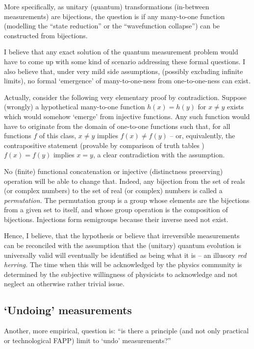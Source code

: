 \documentclass[%
 preprint,
 showpacs,
 showkeys,
 preprintnumbers,
 amsmath,amssymb,
 aps,
  pra,
  longbibliography,
 ]{revtex4-1}
\begin{document}
More specifically, as unitary (quantum) transformations (in-between measurements) are bijections,
the question is if any many-to-one function (modelling the ``state reduction''
or the ``wavefunction collapse'')  can be constructed from bijections.

I believe that any exact solution of the quantum measurement problem would
have to come up with some kind of scenario addressing these formal questions.
I also believe that, under very mild side assumptions,
(possibly excluding infinite limits),
no formal `emergence' of many-to-one-ness  from one-to-one-ness can exist.

Actually, consider the following very elementary proof by contradiction.
Suppose (wrongly) a hypothetical many-to-one function $h(x)=h(y)$ for $x\neq y$ exists which would somehow
`emerge' from injective functions.
Any such function would have to originate from the domain of one-to-one functions such that,
for all functions $f$ of this class,  $x\neq y$ implies  $f(x)\neq f(y)$
-- or, equivalently, the contrapositive statement (provable by comparison of truth tables \cite[chapter~3]{Daepp})
$f(x) = f(y)$ implies $x = y$,  a clear contradiction with the assumption.

No (finite) functional concatenation or injective (distinctness preserving) operation will be able to change that.
Indeed, any bijection from the set of reals (or complex numbers) to the set of real (or complex) numbers
is called a {\em permutation.}
The permutation group is a group whose elements are the bijections from a given set to itself,
and whose group operation is the composition of bijections.
Injections form semigroups because their inverse need not exist.


Hence, I believe, that the hypothesis or believe that
irreversible measurements can be reconciled with the assumption that the
(unitary) quantum evolution is universally valid will eventually
be identified as being what it is -- an illusory {\em red herring.}
The time when this will be acknowledged by the physics community is determined
by the subjective willingness of physicists to acknowledge
and not neglect an otherwise rather trivial issue.


\subsection{`Undoing' measurements}

Another, more empirical, question is:
``is there a principle (and not only practical or technological FAPP) limit to `undo' measurements?''
\end{document}
